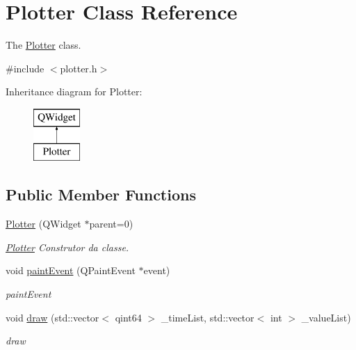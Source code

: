\hypertarget{class_plotter}{}\section{Plotter Class Reference}
\label{class_plotter}


The \mbox{\hyperlink{class_plotter}{Plotter}} class.  




{\ttfamily \#include $<$plotter.\+h$>$}

Inheritance diagram for Plotter\+:\begin{figure}[H]
\begin{center}
\leavevmode
\includegraphics[height=2.000000cm]{class_plotter}
\end{center}
\end{figure}
\subsection*{Public Member Functions}
\begin{DoxyCompactItemize}
\item 
\mbox{\hyperlink{class_plotter_a367b6890c36910a27ec710ac3693e64b}{Plotter}} (Q\+Widget $\ast$parent=0)
\begin{DoxyCompactList}\small\item\em \mbox{\hyperlink{class_plotter}{Plotter}} Construtor da classe. \end{DoxyCompactList}\item 
void \mbox{\hyperlink{class_plotter_a06477bf987646f000a8982db1352a11d}{paint\+Event}} (Q\+Paint\+Event $\ast$event)
\begin{DoxyCompactList}\small\item\em paint\+Event \end{DoxyCompactList}\item 
void \mbox{\hyperlink{class_plotter_abeafad6e6d4ffae03d5e50dbf85e83f6}{draw}} (std\+::vector$<$ qint64 $>$ \+\_\+time\+List, std\+::vector$<$ int $>$ \+\_\+value\+List)
\begin{DoxyCompactList}\small\item\em draw \end{DoxyCompactList}\end{DoxyCompactItemize}



